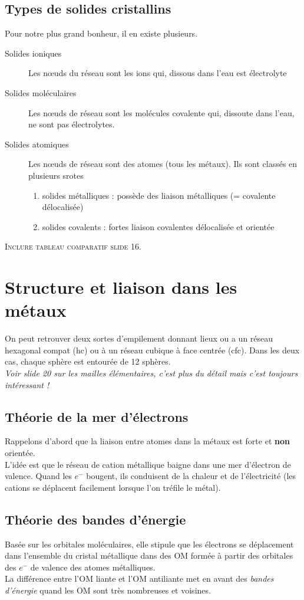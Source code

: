 \documentclass[british,french,11pt, a4paper, openany]{book}
\begin{document}
	\subsection*{Types de solides cristallins}
	Pour notre plus grand bonheur, il en existe plusieurs.
	\begin{description}
		\item[Solides ioniques] Les nœuds du réseau sont les ions qui, dissous dans l'eau est électrolyte 
		\item[Solides moléculaires] Les nœuds de réseau sont les molécules covalente qui, dissoute dans l'eau, ne sont pas électrolytes.
		\item[Solides atomiques] Les nœuds de réseau sont des atomes (tous les métaux). Ils sont classés en plusieurs srotes
		\begin{enumerate}
			\item solides métalliques : possède des liaison métalliques (= covalente délocalisée)
			\item solides covalents : fortes liaison covalentes délocalisée et orientée
		\end{enumerate}
	\end{description}
	\textsc{Inclure tableau comparatif slide 16.}
	
	
	\section{Structure et liaison dans les métaux}
	On peut retrouver deux sortes d'empilement donnant lieux ou a un réseau hexagonal compat (hc) ou à un réseau cubique à face centrée (cfc). Dans les deux cas, chaque sphère est entourée de 12 sphères.\\
	\textit{Voir slide 20 sur les mailles élémentaires, c'est plus du détail mais c'est toujours intéressant !}
	
	\subsection*{Théorie de la mer d'électrons}
	Rappelons d'abord que la liaison entre atomes dans la métaux est forte et \textbf{non} orientée.\\
	
	L'idée est que le réseau de cation métallique baigne dans une mer d'électron de valence. Quand les $e^-$ bougent, ils conduisent de la chaleur et de l'électricité (les cations se déplacent facilement lorsque l'on tréfile le métal).
	
	\subsection*{Théorie des bandes d'énergie}
	Basée sur les orbitales moléculaires, elle stipule que les électrons se déplacement dans l'ensemble du cristal métallique dans des OM formée à partir des orbitales des $e^-$ de valence des atomes métalliques.\\
	La différence entre l'OM liante et l'OM antiliante met en avant des \textit{bandes d'énergie} quand les OM sont très nombreuses et voisines.
	
\end{document}
